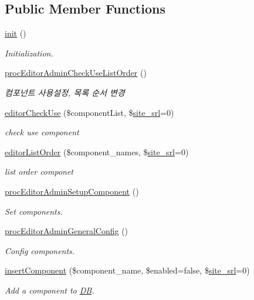 \subsection*{Public Member Functions}
\begin{DoxyCompactItemize}
\item 
\hyperlink{classeditorAdminController_ad93d747ea21b3414d423dcb8b3b54760}{init} ()
\begin{DoxyCompactList}\small\item\em Initialization. \end{DoxyCompactList}\item 
\hyperlink{classeditorAdminController_a00e9dceb8f8bc86baf8edbac76e3d5fd}{proc\+Editor\+Admin\+Check\+Use\+List\+Order} ()
\begin{DoxyCompactList}\small\item\em 컴포넌트 사용설정, 목록 순서 변경 \end{DoxyCompactList}\item 
\hyperlink{classeditorAdminController_ae4663ef7946d055274d39810ef76198a}{editor\+Check\+Use} (\$component\+List, \$\hyperlink{ko_8install_8php_a8b1406b4ad1048041558dce6bfe89004}{site\+\_\+srl}=0)
\begin{DoxyCompactList}\small\item\em check use component \end{DoxyCompactList}\item 
\hyperlink{classeditorAdminController_a531785272cc7a46e86dce7a308a18286}{editor\+List\+Order} (\$component\+\_\+names, \$\hyperlink{ko_8install_8php_a8b1406b4ad1048041558dce6bfe89004}{site\+\_\+srl}=0)
\begin{DoxyCompactList}\small\item\em list order componet \end{DoxyCompactList}\item 
\hyperlink{classeditorAdminController_a42b74f6454a6b5f75a2029c13452e0b8}{proc\+Editor\+Admin\+Setup\+Component} ()
\begin{DoxyCompactList}\small\item\em Set components. \end{DoxyCompactList}\item 
\hyperlink{classeditorAdminController_ad24e312c55f5bd02a7d7e03dad843157}{proc\+Editor\+Admin\+General\+Config} ()
\begin{DoxyCompactList}\small\item\em Config components. \end{DoxyCompactList}\item 
\hyperlink{classeditorAdminController_a38775ee5db2277eb943096661ae25fd9}{insert\+Component} (\$component\+\_\+name, \$enabled=false, \$\hyperlink{ko_8install_8php_a8b1406b4ad1048041558dce6bfe89004}{site\+\_\+srl}=0)
\begin{DoxyCompactList}\small\item\em Add a component to \hyperlink{classDB}{D\+B}. \end{DoxyCompactList}\end{DoxyCompactItemize}

